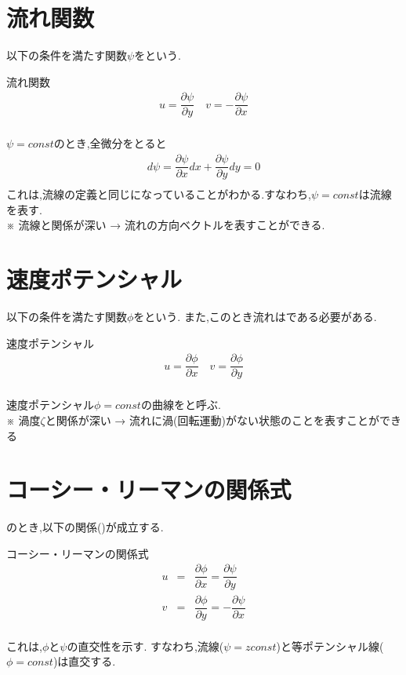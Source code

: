 \documentclass[a4paper]{jsarticle}
\begin{document}
\section{流れ関数}
以下の条件を満たす関数$\psi$をという.
\begin{itembox}[l]{流れ関数}
    \begin{eqnarray*}
        u=\dfrac{\partial \psi}{\partial y}\quad v=-\dfrac{\partial \psi}{\partial x}\\
    \end{eqnarray*}
\end{itembox}
$\psi =const$のとき,全微分をとると\\
\begin{eqnarray*}
    d\psi = \dfrac{\partial \psi}{\partial x}dx+\dfrac{\partial \psi}{\partial y}dy=0\\
\end{eqnarray*}
これは,流線の定義と同じになっていることがわかる.すなわち,$\psi = const$は流線を表す.\\
※ 流線と関係が深い → 流れの方向ベクトルを表すことができる.
\section{速度ポテンシャル}
以下の条件を満たす関数$\phi$をという.
また,このとき流れはである必要がある.
\begin{itembox}[l]{速度ポテンシャル}
    \begin{eqnarray*}
        u=\dfrac{\partial \phi}{\partial x}\quad v=\dfrac{\partial \phi}{\partial y}\\
    \end{eqnarray*}
\end{itembox}
速度ポテンシャル$\phi = const$の曲線をと呼ぶ.\\
※ 渦度$\zeta$と関係が深い → 流れに渦(回転運動)がない状態のことを表すことができる
\section{コーシー・リーマンの関係式}
のとき,以下の関係()が成立する.
\begin{itembox}[l]{コーシー・リーマンの関係式}
    \begin{eqnarray*}
        u&=&\dfrac{\partial \phi}{\partial x}=\dfrac{\partial \psi}{\partial y}\\
        v&=&\dfrac{\partial \phi}{\partial y}=-\dfrac{\partial \psi}{\partial x}\\
    \end{eqnarray*}
\end{itembox}
これは,$\phi$と$\psi$の直交性を示す.
すなわち,流線($\psi=zconst$)と等ポテンシャル線($\phi=const$)は直交する.
\end{document}
